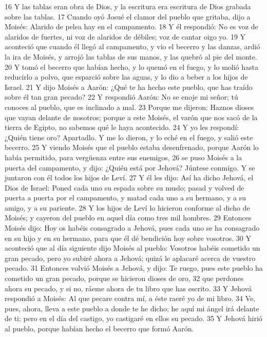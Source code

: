 16 Y las tablas eran obra de Dios, y la escritura era escritura de Dios grabada sobre las tablas.
17 Cuando oyó Josué el clamor del pueblo que gritaba, dijo a Moisés: Alarido de pelea hay en el campamento.
18 Y él respondió: No es voz de alaridos de fuertes, ni voz de alaridos de débiles; voz de cantar oigo yo.
19 Y aconteció que cuando él llegó al campamento, y vio el becerro y las danzas, ardió la ira de Moisés, y arrojó las tablas de sus manos, y las quebró al pie del monte.
20 Y tomó el becerro que habían hecho, y lo quemó en el fuego, y lo molió hasta reducirlo a polvo, que esparció sobre las aguas, y lo dio a beber a los hijos de Israel.
21 Y dijo Moisés a Aarón: ¿Qué te ha hecho este pueblo, que has traído sobre él tan gran pecado?
22 Y respondió Aarón: No se enoje mi señor; tú conoces al pueblo, que es inclinado a mal.
23 Porque me dijeron: Haznos dioses que vayan delante de nosotros; porque a este Moisés, el varón que nos sacó de la tierra de Egipto, no sabemos qué le haya acontecido.
24 Y yo les respondí: ¿Quién tiene oro? Apartadlo. Y me lo dieron, y lo eché en el fuego, y salió este becerro.
25 Y viendo Moisés que el pueblo estaba desenfrenado, porque Aarón lo había permitido, para vergüenza entre sus enemigos,
26 se puso Moisés a la puerta del campamento, y dijo: ¿Quién está por Jehová? Júntese conmigo. Y se juntaron con él todos los hijos de Leví.
27 Y él les dijo: Así ha dicho Jehová, el Dios de Israel: Poned cada uno su espada sobre su muslo; pasad y volved de puerta a puerta por el campamento, y matad cada uno a su hermano, y a su amigo, y a su pariente.
28 Y los hijos de Leví lo hicieron conforme al dicho de Moisés; y cayeron del pueblo en aquel día como tres mil hombres.
29 Entonces Moisés dijo: Hoy os habéis consagrado a Jehová, pues cada uno se ha consagrado en su hijo y en su hermano, para que él dé bendición hoy sobre vosotros.
30 Y aconteció que al día siguiente dijo Moisés al pueblo: Vosotros habéis cometido un gran pecado, pero yo subiré ahora a Jehová; quizá le aplacaré acerca de vuestro pecado.
31 Entonces volvió Moisés a Jehová, y dijo: Te ruego, pues este pueblo ha cometido un gran pecado, porque se hicieron dioses de oro,
32 que perdones ahora su pecado, y si no, ráeme ahora de tu libro que has escrito.
33 Y Jehová respondió a Moisés: Al que pecare contra mí, a éste raeré yo de mi libro.
34 Ve, pues, ahora, lleva a este pueblo a donde te he dicho; he aquí mi ángel irá delante de ti; pero en el día del castigo, yo castigaré en ellos su pecado.
35 Y Jehová hirió al pueblo, porque habían hecho el becerro que formó Aarón.

